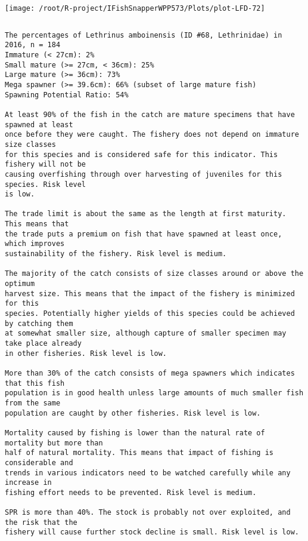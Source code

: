 \documentclass{report}\usepackage[]{graphicx}\usepackage[]{color}
\makeatletter
\def\maxwidth{ %
  \ifdim\Gin@nat@width>\linewidth
    \linewidth
  \else
    \Gin@nat@width
  \fi
}
\newenvironment{kframe}{%
 \def\at@end@of@kframe{}%
 \ifinner\ifhmode%
  \def\at@end@of@kframe{\end{minipage}}%
  \begin{minipage}{\columnwidth}%
 \fi\fi%
 \def\FrameCommand##1{\hskip\@totalleftmargin \hskip-\fboxsep
 \colorbox{shadecolor}{##1}\hskip-\fboxsep
     \hskip-\linewidth \hskip-\@totalleftmargin \hskip\columnwidth}%
 \MakeFramed {\advance\hsize-\width
   \@totalleftmargin\z@ \linewidth\hsize
   \@setminipage}}%
 {\par\unskip\endMakeFramed%
 \at@end@of@kframe}
\newenvironment{knitrout}{}{} %
\makeatother
\begin{document}
\begin{knitrout}
\texttt{[image: /root/R-project/IFishSnapperWPP573/Plots/plot-LFD-72]} 
\begin{kframe}\begin{verbatim}
\end{verbatim}
\end{kframe}
\clearpage
\newpage
\begin{kframe}\begin{verbatim}The percentages of Lethrinus amboinensis (ID #68, Lethrinidae) in 2016, n = 184
Immature (< 27cm): 2%
Small mature (>= 27cm, < 36cm): 25%
Large mature (>= 36cm): 73%
Mega spawner (>= 39.6cm): 66% (subset of large mature fish)
Spawning Potential Ratio: 54%
 
At least 90% of the fish in the catch are mature specimens that have spawned at least
once before they were caught. The fishery does not depend on immature size classes
for this species and is considered safe for this indicator. This fishery will not be
causing overfishing through over harvesting of juveniles for this species. Risk level
is low.

The trade limit is about the same as the length at first maturity.  This means that
the trade puts a premium on fish that have spawned at least once, which improves
sustainability of the fishery. Risk level is medium.

The majority of the catch consists of size classes around or above the optimum
harvest size. This means that the impact of the fishery is minimized for this
species. Potentially higher yields of this species could be achieved by catching them
at somewhat smaller size, although capture of smaller specimen may take place already
in other fisheries. Risk level is low.

More than 30% of the catch consists of mega spawners which indicates that this fish
population is in good health unless large amounts of much smaller fish from the same
population are caught by other fisheries. Risk level is low.
 
Mortality caused by fishing is lower than the natural rate of mortality but more than
half of natural mortality. This means that impact of fishing is considerable and
trends in various indicators need to be watched carefully while any increase in
fishing effort needs to be prevented. Risk level is medium.
 
SPR is more than 40%. The stock is probably not over exploited, and the risk that the
fishery will cause further stock decline is small. Risk level is low.
 

\end{verbatim}
\end{kframe}
\end{knitrout}
\end{document}
